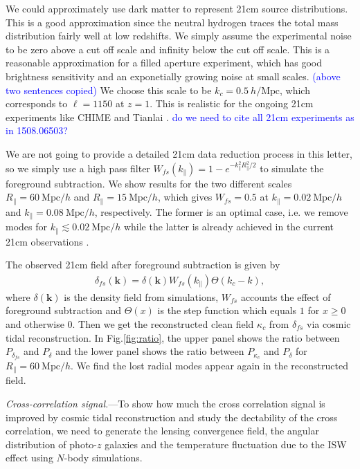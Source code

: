 \documentclass[aps,prl,twocolumn,showpacs,superscriptaddress,groupedaddress,nofootinbib]{revtex4}  %
\newcommand{\mr}{\mathrm}
\newcommand{\tcb}{\textcolor{blue}}
\begin{document}
We could approximately use dark matter to represent 21cm source distributions.
This is a good approximation since the neutral hydrogen traces the total mass
distribution fairly well at low redshifts. We simply assume the experimental
noise to be zero above a cut off scale and infinity below the cut off scale.
This is a reasonable approximation for a filled aperture experiment, which
has good brightness sensitivity and an exponetially growing noise at small 
scales. \tcb{(above two sentences copied)}
We choose this scale to be $k_c=0.5\ h/\mr{Mpc}$, which corresponds
to $\ell=1150$ at $z=1$. This is realistic for the ongoing 21cm experiments like
CHIME \cite{2014SPIE.9145E..22B}\cite{2014SPIE.9145E..4VN}
and Tianlai \cite{2012IJMPS..12..256C}\cite{2015ApJ...798...40X}.
\tcb{do we need to cite all 21cm experiments as in 1508.06503?}

We are not going to provide a detailed 21cm data reduction process in this 
letter, so we simply  use a high pass filter 
$W_{fs}(k_\parallel)=1-e^{-k_\parallel^2R_\parallel^2/2}$ to simulate the 
foreground subtraction. We show results for the two different scales 
$R_\parallel=60\ \mr{Mpc}/h$ and $R_\parallel=15\ \mr{Mpc}/h$, which gives
$W_{fs}=0.5$ at $k_\parallel=0.02\ \mr{Mpc}/h$ and 
$k_\parallel=0.08\ \mr{Mpc}/h$, respectively. The former is an optimal case, 
i.e. we remove modes for $k_\parallel\lesssim0.02\ \mr{Mpc}/h$ while the latter
is already achieved in the current 21cm observations 
\cite{2013ApJ...763L..20M}\cite{2013MNRAS.434L..46S}.

The observed 21cm field after foreground subtraction is given by 
\begin{eqnarray}
\delta_{fs}(\bm{k})=\delta(\bm{k})W_{fs}(k_\parallel)\Theta(k_c-k),
\end{eqnarray}
where $\delta(\bm{k})$ is the density field from simulations, $W_{fs}$ accounts
the effect of foreground subtraction and $\Theta(x)$ is the step function 
which equals $1$ for $x\ge0$ and otherwise $0$.
Then we get the reconstructed clean field $\kappa_c$ from $\delta_{fs}$ via
cosmic tidal reconstruction. In Fig.\ref{fig:ratio}, the upper panel shows the 
ratio between $P_{\delta_{fs}}$ and $P_{\delta}$ and the lower panel shows the
ratio between $P_{\kappa_c}$ and $P_\delta$ for $R_\parallel=60\ \mr{Mpc}/h$. 
We find the lost radial modes appear again in the reconstructed field.

{\it Cross-correlation signal.}---To show how much the cross correlation signal
is improved by cosmic tidal reconstruction and study the dectability of the
cross correlation, we need to generate the lensing convergence field,
the angular distribution of photo-$z$ galaxies and the temperature fluctuation
due to the ISW effect using $N$-body simulations.
\end{document}
